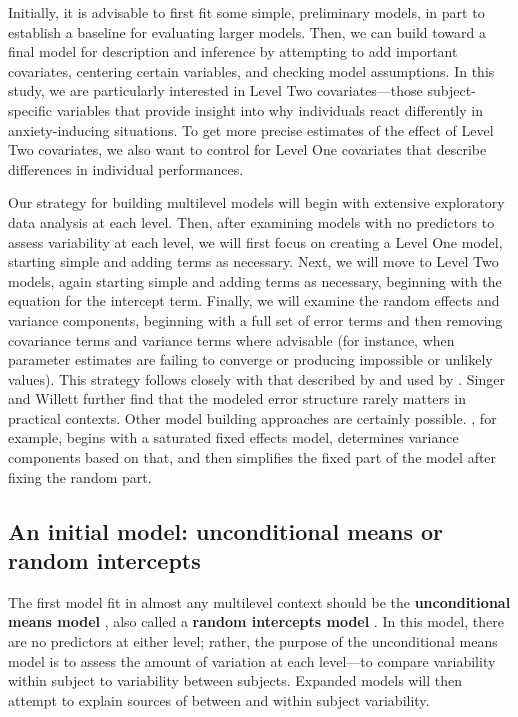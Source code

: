 \documentclass[
]{krantz}
\begin{document}
Initially, it is advisable to first fit some simple, preliminary models, in part to establish a baseline for evaluating larger models. Then, we can build toward a final model for description and inference by attempting to add important covariates, centering certain variables, and checking model assumptions. In this study, we are particularly interested in Level Two covariates---those subject-specific variables that provide insight into why individuals react differently in anxiety-inducing situations. To get more precise estimates of the effect of Level Two covariates, we also want to control for Level One covariates that describe differences in individual performances.

Our strategy for building multilevel models will begin with extensive exploratory data analysis at each level. Then, after examining models with no predictors to assess variability at each level, we will first focus on creating a Level One model, starting simple and adding terms as necessary. Next, we will move to Level Two models, again starting simple and adding terms as necessary, beginning with the equation for the intercept term. Finally, we will examine the random effects and variance components, beginning with a full set of error terms and then removing covariance terms and variance terms where advisable (for instance, when parameter estimates are failing to converge or producing impossible or unlikely values). This strategy follows closely with that described by \citet{Bryk2002} and used by \citet{Singer2003}. Singer and Willett further find that the modeled error structure rarely matters in practical contexts. Other model building approaches are certainly possible. \citet{Diggle2002}, for example, begins with a saturated fixed effects model, determines variance components based on that, and then simplifies the fixed part of the model after fixing the random part.

\hypertarget{modela8}{%
\subsection{An initial model: unconditional means or random intercepts}\label{modela8}}

The first model fit in almost any multilevel context should be the \textbf{unconditional means model} , also called a \textbf{random intercepts model} . In this model, there are no predictors at either level; rather, the purpose of the unconditional means model is to assess the amount of variation at each level---to compare variability within subject to variability between subjects. Expanded models will then attempt to explain sources of between and within subject variability.
\end{document}
